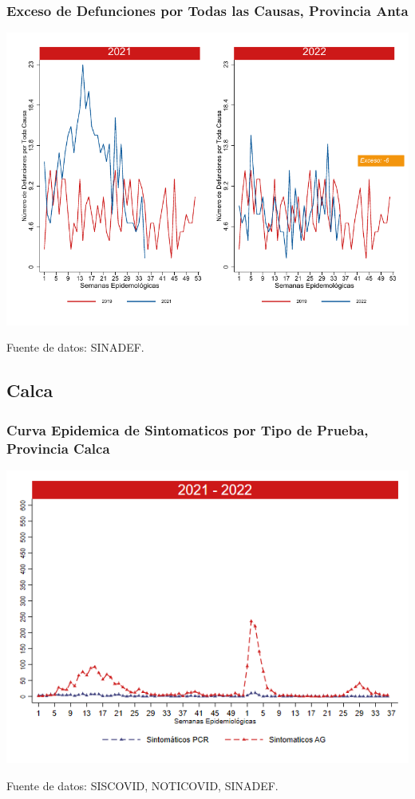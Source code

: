 \documentclass[xcolor=table]{beamer}
\begin{document}
\begin{frame}
	\frametitle{Exceso de Defunciones por Todas las Causas, Provincia Anta}
	\vspace{-.5cm}
	\begin{center}
		\includegraphics[width=0.8\linewidth, trim={0cm .5cm 0cm 0.2cm},clip]{../figuras/exceso_2.pdf}
	\end{center}
	{\tiny Fuente de datos: SINADEF.}
	
	\hyperlink{indicadores_provinciales}{}
\end{frame}

\subsection{Calca}
\begin{frame}[label=Calca]
	\frametitle{Curva Epidemica de Sintomaticos por Tipo de Prueba, Provincia Calca}
	\vspace{-.5cm}
	\begin{center}
		\includegraphics[width=0.8\linewidth, trim={0cm .5cm 0cm 0.2cm},clip]{../figuras/sinto_prueba20_21_3.png}
	\end{center}
	{\tiny Fuente de datos: SISCOVID, NOTICOVID, SINADEF.}
	\hyperlink{TipoPrueba}{}
\end{frame}
\end{document}
